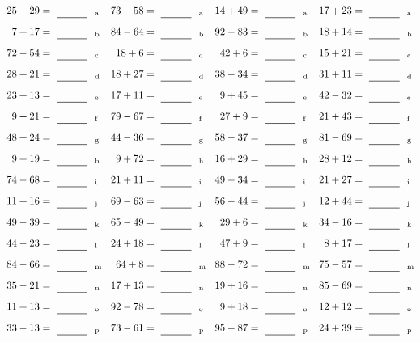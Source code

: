 \documentclass
[
  draft    = true,
  fontsize = 11pt,
  parskip  = half-
]
{scrartcl}
\begin{document}
\clearpage
\begin{align*}
    \pline{25+29}&=\rline{a}
  & \pline{73-58}&=\rline{a}
  & \pline{14+49}&=\rline{a}
  & \pline{17+23}&=\rline{a} \\[1ex]
    \pline{7+17}&=\rline{b}
  & \pline{84-64}&=\rline{b}
  & \pline{92-83}&=\rline{b}
  & \pline{18+14}&=\rline{b} \\[1ex]
    \pline{72-54}&=\rline{c}
  & \pline{18+6}&=\rline{c}
  & \pline{42+6}&=\rline{c}
  & \pline{15+21}&=\rline{c} \\[1ex]
    \pline{28+21}&=\rline{d}
  & \pline{18+27}&=\rline{d}
  & \pline{38-34}&=\rline{d}
  & \pline{31+11}&=\rline{d} \\[1ex]
    \pline{23+13}&=\rline{e}
  & \pline{17+11}&=\rline{e}
  & \pline{9+45}&=\rline{e}
  & \pline{42-32}&=\rline{e} \\[1ex]
    \pline{9+21}&=\rline{f}
  & \pline{79-67}&=\rline{f}
  & \pline{27+9}&=\rline{f}
  & \pline{21+43}&=\rline{f} \\[1ex]
    \pline{48+24}&=\rline{g}
  & \pline{44-36}&=\rline{g}
  & \pline{58-37}&=\rline{g}
  & \pline{81-69}&=\rline{g} \\[1ex]
    \pline{9+19}&=\rline{h}
  & \pline{9+72}&=\rline{h}
  & \pline{16+29}&=\rline{h}
  & \pline{28+12}&=\rline{h} \\[1ex]
    \pline{74-68}&=\rline{i}
  & \pline{21+11}&=\rline{i}
  & \pline{49-34}&=\rline{i}
  & \pline{21+27}&=\rline{i} \\[1ex]
    \pline{11+16}&=\rline{j}
  & \pline{69-63}&=\rline{j}
  & \pline{56-44}&=\rline{j}
  & \pline{12+44}&=\rline{j} \\[1ex]
    \pline{49-39}&=\rline{k}
  & \pline{65-49}&=\rline{k}
  & \pline{29+6}&=\rline{k}
  & \pline{34-16}&=\rline{k} \\[1ex]
    \pline{44-23}&=\rline{l}
  & \pline{24+18}&=\rline{l}
  & \pline{47+9}&=\rline{l}
  & \pline{8+17}&=\rline{l} \\[1ex]
    \pline{84-66}&=\rline{m}
  & \pline{64+8}&=\rline{m}
  & \pline{88-72}&=\rline{m}
  & \pline{75-57}&=\rline{m} \\[1ex]
    \pline{35-21}&=\rline{n}
  & \pline{17+13}&=\rline{n}
  & \pline{19+16}&=\rline{n}
  & \pline{85-69}&=\rline{n} \\[1ex]
    \pline{11+13}&=\rline{o}
  & \pline{92-78}&=\rline{o}
  & \pline{9+18}&=\rline{o}
  & \pline{12+12}&=\rline{o} \\[1ex]
    \pline{33-13}&=\rline{p}
  & \pline{73-61}&=\rline{p}
  & \pline{95-87}&=\rline{p}
  & \pline{24+39}&=\rline{p}
\end{align*}
\end{document}
